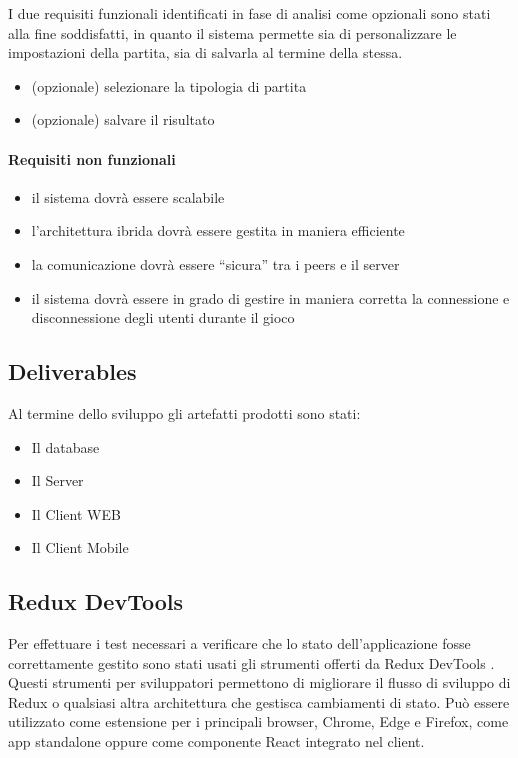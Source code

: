 I due requisiti funzionali identificati in fase di analisi come opzionali sono stati alla fine soddisfatti, in quanto il sistema permette sia di personalizzare le impostazioni della partita, sia di salvarla al termine della stessa.
\begin{itemize}[label={\checkmark}]
    \item (opzionale) selezionare la tipologia di partita
    \item (opzionale) salvare il risultato
\end{itemize}

\paragraph{Requisiti non funzionali}
\begin{itemize}[label={\checkmark}]
    \item il sistema dovrà essere scalabile
    \item l'architettura ibrida dovrà essere gestita in maniera efficiente
    \item la comunicazione dovrà essere “sicura” tra i peers e il server
    \item il sistema dovrà essere in grado di gestire in maniera corretta la connessione e disconnessione degli utenti durante il gioco
\end{itemize}

\subsection{Deliverables}
Al termine dello sviluppo gli artefatti prodotti sono stati:

\begin{itemize}[label={\checkmark}]
    \item Il database
    \item Il Server
    \item Il Client WEB
\end{itemize}
\begin{itemize}[label={$\times$}]
    \item Il Client Mobile
\end{itemize}

\subsection{Redux DevTools}
Per effettuare i test necessari a verificare che lo stato dell'applicazione fosse correttamente gestito sono stati usati gli strumenti offerti da Redux DevTools \cite{githubGitHubReduxjsreduxdevtools}.
Questi strumenti per sviluppatori permettono di migliorare il flusso di sviluppo di Redux o qualsiasi altra architettura che gestisca cambiamenti di stato. Può essere utilizzato come estensione per i principali browser, Chrome, Edge e Firefox, come app standalone oppure come componente React integrato nel client.

